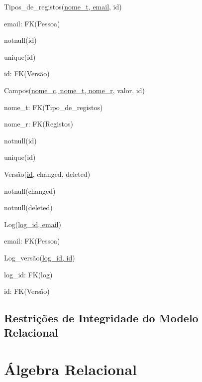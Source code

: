 \documentclass[11pt,a4paper]{article}
\begin{document}
\begin{description}[noitemsep]
	\item Tipos\_de\_registos(\underline{nome\_t, email}, id)
	\item email: FK(Pessoa)
	\item notnull(id)
	\item unique(id)
	\item id: FK(Vers\~{a}o)
\end{description}

\begin{description}[noitemsep]
	\item Campos(\underline{nome\_c, nome\_t, nome\_r}, valor, id)
	\item nome\_t: FK(Tipo\_de\_registos)
	\item nome\_r: FK(Registos)
	\item notnull(id)
	\item unique(id)
\end{description}

\begin{description}[noitemsep]
	\item Vers\~{a}o(\underline{id}, changed, deleted)
	\item notnull(changed)
	\item notnull(deleted)
\end{description}

\begin{description}[noitemsep]
	\item Log(\underline{log\_id, email})
	\item email: FK(Pessoa)
\end{description}

\begin{description}[noitemsep]
	\item Log\_vers\~{a}o(\underline{log\_id, id})
	\item log\_id: FK(log)
	\item id: FK(Vers\~{a}o)
\end{description}








\subsection{Restri\c{c}\~oes de Integridade do Modelo Relacional}
\section{\'{A}lgebra Relacional}
\end{document}
